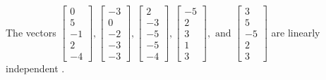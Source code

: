 \begin{exercise}
\begin{exerciseStatement}
  \end{exerciseStatement}
  \begin{exerciseAnswer}
   The vectors \(\left[\begin{array}{r}
0 \\
5 \\
-1 \\
2 \\
-4
\end{array}\right] , \left[\begin{array}{r}
-3 \\
0 \\
-2 \\
-3 \\
-3
\end{array}\right] , \left[\begin{array}{r}
2 \\
-3 \\
-5 \\
-5 \\
-4
\end{array}\right] , \left[\begin{array}{r}
-5 \\
2 \\
3 \\
1 \\
3
\end{array}\right] , \text{ and } \left[\begin{array}{r}
3 \\
5 \\
-5 \\
2 \\
3
\end{array}\right]\) are 
  	 linearly independent  .
  


  \end{exerciseAnswer}
\end{exercise}